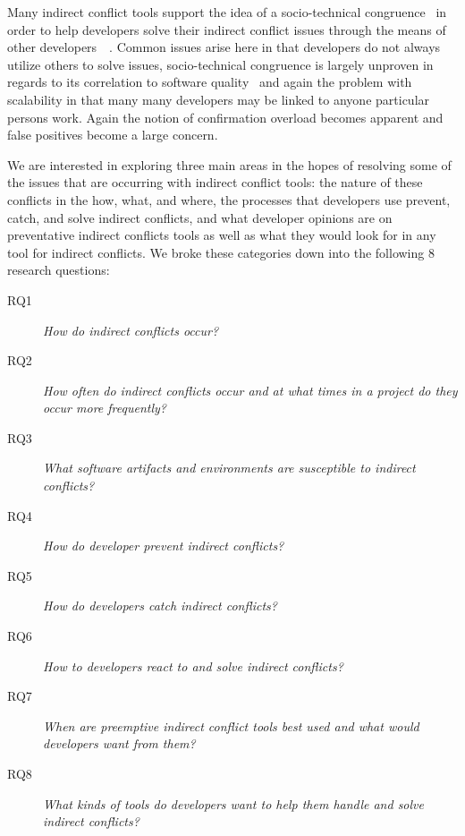 \documentclass[conference]{IEEEtran}
\makeatletter
\def\namedlabel#1#2{\begingroup
   \def\@currentlabel{#2}%
   \label{#1}\endgroup
}
\makeatother
\begin{document}
Many indirect conflict tools support the idea of a socio-technical congruence~\cite{Kwan:2011:ESC} in order to help
developers solve their indirect conflict issues through the means of other 
developers~\cite{Begel:2010:CDE}~\cite{Borici:2012:CHA}. Common issues arise here in that developers do not always
utilize others to solve issues, socio-technical congruence is largely unproven in regards to its correlation to
software quality~\cite{Kwan:2011:SCE} and again the problem with scalability in that many many developers may be linked to
anyone particular persons work. Again the notion of confirmation overload becomes apparent and false positives become a large
concern.

We are interested in exploring three main areas in the hopes of resolving some of the issues that are occurring
with indirect conflict tools: the nature of these conflicts in the how, what, and where, the processes that
developers use prevent, catch, and solve indirect conflicts, and what developer opinions are on preventative 
indirect conflicts tools as well as what they would look for in any tool for indirect conflicts. We broke
these categories down into the following 8 research questions:

\begin{description}
	\item[RQ1\namedlabel{itm:rq1}{RQ1}] \textit{How do indirect conflicts occur?}
	\item[RQ2\namedlabel{itm:rq2}{RQ2}] \textit{How often do indirect conflicts occur and at what times in a project do they occur more frequently?}
	\item[RQ3\namedlabel{itm:rq3}{RQ3}] \textit{What software artifacts and environments are susceptible to indirect conflicts?}
	\item[RQ4\namedlabel{itm:rq4}{RQ4}] \textit{How do developer prevent indirect conflicts?}
	\item[RQ5\namedlabel{itm:rq5}{RQ5}] \textit{How do developers catch indirect conflicts?}
	\item[RQ6\namedlabel{itm:rq6}{RQ6}] \textit{How to developers react to and solve indirect conflicts?}
	\item[RQ7\namedlabel{itm:rq7}{RQ7}] \textit{When are preemptive indirect conflict tools best used and what would developers want from them?}
	\item[RQ8\namedlabel{itm:rq8}{RQ8}] \textit{What kinds of tools do developers want to help them handle and solve indirect conflicts?}
\end{description}
\end{document}
